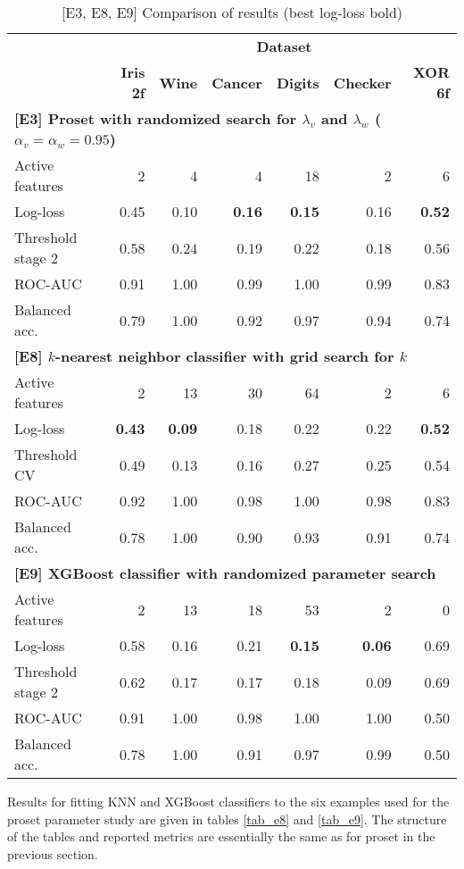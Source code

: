 %
\begin{table}
\caption{[E3, E8, E9] Comparison of results (best log-loss bold)}
\label{tab_e3_e8_e9}
%
\begin{center}
\small
\begin{tabular}{|lrrrrrr|}
\hline
&\multicolumn{6}{c|}{\textbf{\hrulefill\ Dataset \hrulefill}}\\
&\textbf{Iris 2f}&\textbf{Wine}&\textbf{Cancer}&\textbf{Digits}&\textbf{Checker}&\textbf{XOR 6f}\\
\multicolumn{7}{|l|}{\textbf{[E3] Proset with randomized search for $\lambda_v$ and $\lambda_w$ ($\alpha_v=\alpha_w=0.95$)}}\\
Active features&2&4&4&18&2&6\\
Log-loss&0.45&0.10&\textbf{0.16}&\textbf{0.15}&0.16&\textbf{0.52}\\
Threshold stage 2&0.58&0.24&0.19&0.22&0.18&0.56\\
ROC-AUC&0.91&1.00&0.99&1.00&0.99&0.83\\
Balanced acc.&0.79&1.00&0.92&0.97&0.94&0.74\\
\multicolumn{7}{|l|}{\textbf{[E8] $k$-nearest neighbor classifier with grid search for $k$}}\\
Active features&2&13&30&64&2&6\\
Log-loss&\textbf{0.43}&\textbf{0.09}&0.18&0.22&0.22&\textbf{0.52}\\
Threshold CV&0.49&0.13&0.16&0.27&0.25&0.54\\
ROC-AUC&0.92&1.00&0.98&1.00&0.98&0.83\\
Balanced acc.&0.78&1.00&0.90&0.93&0.91&0.74\\
\multicolumn{7}{|l|}{\textbf{[E9] XGBoost classifier with randomized parameter search}}\\
Active features&2&13&18&53&2&0\\
Log-loss&0.58&0.16&0.21&\textbf{0.15}&\textbf{0.06}&0.69\\
Threshold stage 2&0.62&0.17&0.17&0.18&0.09&0.69\\
ROC-AUC&0.91&1.00&0.98&1.00&1.00&0.50\\
Balanced acc.&0.78&1.00&0.91&0.97&0.99&0.50\\
\hline
\end{tabular}
\end{center}
\end{table}
%
Results for fitting KNN and XGBoost classifiers to the six examples used for the proset parameter study are given in tables \ref{tab_e8} and \ref{tab_e9}.
The structure of the tables and reported metrics are essentially the same as for proset in the previous section.
